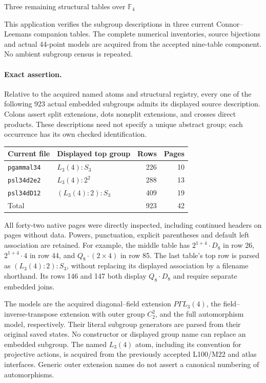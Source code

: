 \documentclass[11pt]{article}
\begin{document}
\begin{center}\Large Three remaining structural tables over $\mathbb F_4$\end{center}
\noindent This application verifies the subgroup descriptions in three current
Connor--Leemans companion tables. The complete numerical inventories,
source bijections and actual 44-point models are acquired from the accepted
nine-table component. No ambient subgroup census is repeated.

\paragraph{Exact assertion.}
Relative to the acquired named atoms and structural registry, every one of
the following 923 actual embedded subgroups admits its displayed source
description. Colons assert split extensions, dots nonsplit extensions,
and crosses direct products. These descriptions need not specify a unique
abstract group; each occurrence has its own checked identification.
\begin{center}
\begin{tabular}{llrr}\toprule
Current file&Displayed top group&Rows&Pages\\\midrule
\texttt{pgammal34}&$L_3(4):S_3$&226&10\\
\texttt{psl34d2e2}&$L_3(4):2^2$&288&13\\
\texttt{psl34dD12}&$(L_3(4):2):S_3$&409&19\\\midrule
Total&&923&42\\\bottomrule
\end{tabular}\end{center}
All forty-two native pages were directly inspected, including continued
headers on pages without data. Powers, punctuation, explicit parentheses
and default left association are retained. For example, the middle table
has $2^{1+4}\mathbin{\cdot}D_8$ in row 26,
$2^{1+4}\mathbin{\cdot}4$ in row 44, and
$Q_8\mathbin{\cdot}(2\times4)$ in row 85.
The last table's top row is parsed as $(L_3(4):2):S_3$, without replacing
its displayed association by a filename shorthand. Its rows 146 and 147
both display $Q_8\mathbin{\cdot}D_8$ and require separate embedded joins.

The models are the acquired diagonal--field extension $P\Gamma L_3(4)$,
the field--inverse-transpose extension with outer group $C_2^2$, and the
full automorphism model, respectively. Their literal subgroup generators
are parsed from their original saved states. No constructor or displayed
group name can replace an embedded subgroup. The named $L_3(4)$ atom,
including its convention for projective actions, is acquired from the
previously accepted L100/M22 and atlas interfaces. Generic outer extension
names do not assert a canonical numbering of automorphisms.
\end{document}
